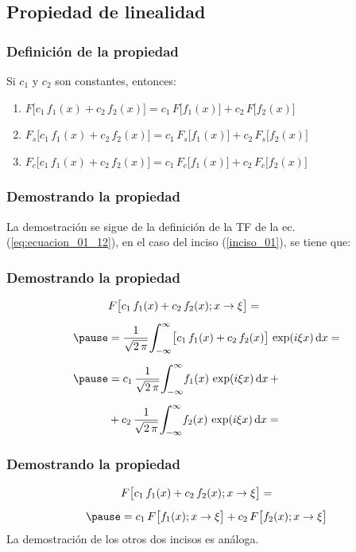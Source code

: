 \subsection{Propiedad de linealidad}

\begin{frame}
\frametitle{Definición de la propiedad}
Si $c_{1}$ y $c_{2}$ son constantes, entonces:
\pause
{}
\begin{enumerate}[<+->]
\item \label{inciso_01} $F \big[ c_{1} \, f_{1} (x) + c_{2} \, f_{2} (x) \big] = c_{1} \, F \big[ f_{1} (x) \big] + c_{2} \, F \big[ f_{2} (x) \big]$
\item $F_{s} \big[ c_{1} \, f_{1} (x) + c_{2} \, f_{2} (x) \big] = c_{1} \, F_{s} \big[ f_{1} (x) \big] + c_{2} \, F_{s} \big[ f_{2} (x) \big]$
\item $F_{c} \big[ c_{1} \, f_{1} (x) + c_{2} \, f_{2} (x) \big] = c_{1} \, F_{c} \big[ f_{1} (x) \big] + c_{2} \, F_{c} \big[ f_{2} (x) \big]$
\end{enumerate}
\end{frame}
\begin{frame}
\frametitle{Demostrando la propiedad}
La demostración se sigue de la definición de la TF de la ec. (\ref{eq:ecuacion_01_12}), en el caso del inciso (\ref{inciso_01}), se tiene que:
\end{frame}
\begin{frame}
\frametitle{Demostrando la propiedad}
\begin{eqnarray*}
\begin{aligned}
&F \big[ c_{1} \, f_{1} (x) + c_{2} \, f_{2} (x) ; x \to \xi \big] = \\[0.5em] \pause
&= \dfrac{1}{\sqrt{2 \, \pi}} \scaleint{6ex}_{\bs -\infty}^{\infty} \big[ c_{1} \, f_{1} (x) + c_{2} \, f_{2} (x) \big] \, \exp(i \xi x) \dd{x} = \\[0.5em] \pause
&= c_{1} \, \dfrac{1}{\sqrt{2 \, \pi}} \scaleint{6ex}_{\bs -\infty}^{\infty} f_{1}(x) \, \exp(i \xi x) \dd{x} + \\[0.5em]
&+ c_{2} \, \dfrac{1}{\sqrt{2 \, \pi}} \scaleint{6ex}_{\bs -\infty}^{\infty} f_{2}(x) \, \exp(i \xi x) \dd{x} = 
\end{aligned}
\end{eqnarray*}
\end{frame}
\begin{frame}
\frametitle{Demostrando la propiedad}
\begin{eqnarray*}
\begin{aligned}
&F \big[ c_{1} \, f_{1} (x) + c_{2} \, f_{2} (x) ; x \to \xi \big] = \\[0.5em] \pause
&= c_{1} \, F \big[ f_{1} (x) ; x \to \xi \big] + c_{2} \, F \big[ f_{2} (x) ; x \to \xi \big]
\end{aligned}
\end{eqnarray*}
La demostración de los otros dos incisos es análoga.
\end{frame}

